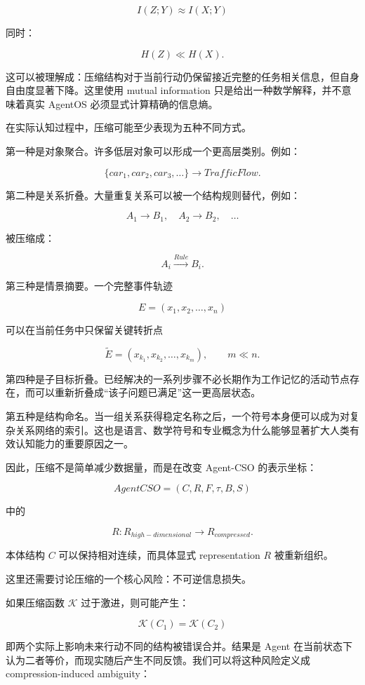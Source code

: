 \[
I(Z;Y)
\approx
I(X;Y)
\]

同时：

\[
H(Z)
\ll
H(X).
\]

这可以被理解成：压缩结构对于当前行动仍保留接近完整的任务相关信息，但自身自由度显著下降。这里使用 mutual information 只是给出一种数学解释，并不意味着真实 AgentOS 必须显式计算精确的信息熵。

在实际认知过程中，压缩可能至少表现为五种不同方式。

第一种是对象聚合。许多低层对象可以形成一个更高层类别。例如：

\[
\{
car_1,
car_2,
car_3,
\ldots
\}
\rightarrow
TrafficFlow.
\]

第二种是关系折叠。大量重复关系可以被一个结构规则替代，例如：

\[
A_1\to B_1,\quad
A_2\to B_2,\quad
\ldots
\]

被压缩成：

\[
A_i
\xrightarrow{Rule}
B_i.
\]

第三种是情景摘要。一个完整事件轨迹

\[
E=
(x_1,x_2,\ldots,x_n)
\]

可以在当前任务中只保留关键转折点

\[
\widetilde E=
(x_{k_1},x_{k_2},\ldots,x_{k_m}),
\qquad
m\ll n.
\]

第四种是子目标折叠。已经解决的一系列步骤不必长期作为工作记忆的活动节点存在，而可以重新折叠成“该子问题已满足”这一更高层状态。

第五种是结构命名。当一组关系获得稳定名称之后，一个符号本身便可以成为对复杂关系网络的索引。这也是语言、数学符号和专业概念为什么能够显著扩大人类有效认知能力的重要原因之一。

因此，压缩不是简单减少数据量，而是在改变 Agent-CSO 的表示坐标：

\[
AgentCSO
=
(C,R,F,\tau,B,S)
\]

中的

\[
R:
R_{high-dimensional}
\rightarrow
R_{compressed}.
\]

本体结构 $C$ 可以保持相对连续，而具体显式 representation $R$ 被重新组织。

这里还需要讨论压缩的一个核心风险：不可逆信息损失。

如果压缩函数 $\mathcal K$ 过于激进，则可能产生：

\[
\mathcal K(C_1)
=
\mathcal K(C_2)
\]

即两个实际上影响未来行动不同的结构被错误合并。结果是 Agent 在当前状态下认为二者等价，而现实随后产生不同反馈。我们可以将这种风险定义成 compression-induced ambiguity：

